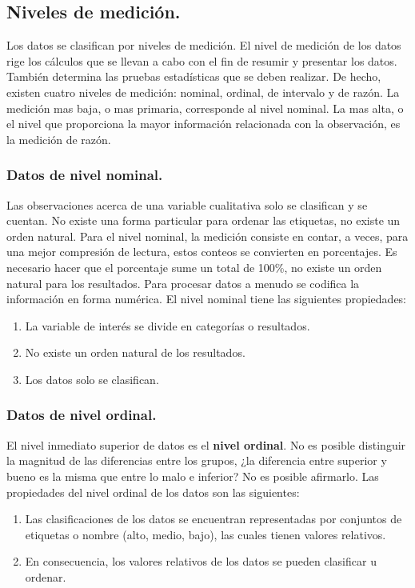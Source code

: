 \documentclass[]{article}
\begin{document}
\subsection{Niveles de medición.}
Los datos se clasifican por niveles de medición. El nivel de medición de los datos rige los cálculos que se llevan a cabo con el fin de resumir y presentar los datos. También determina las pruebas estadísticas que se deben realizar. De hecho, existen cuatro niveles de medición: nominal, ordinal, de intervalo y de razón. La medición mas baja, o mas primaria, corresponde al nivel nominal. La mas alta, o el nivel que proporciona la mayor información relacionada con la observación, es la medición de razón.

\subsubsection*{Datos de nivel nominal.}
Las observaciones acerca de una variable cualitativa solo se clasifican y se cuentan. No existe una forma particular para ordenar las etiquetas, no existe un orden natural. Para el nivel nominal, la medición consiste en contar, a veces, para una mejor compresión de lectura, estos conteos se convierten en porcentajes. Es necesario hacer que el porcentaje sume un total de 100\%, no existe un orden natural para los resultados. Para procesar datos a menudo se codifica la información en forma numérica. El nivel nominal tiene las siguientes propiedades:
\begin{enumerate}
	\item La variable de interés se divide en categorías o resultados.
	\item No existe un orden natural de los resultados.
	\item Los datos solo se clasifican.
\end{enumerate}

\subsubsection*{Datos de nivel ordinal.}
El nivel inmediato superior de datos es el \textbf{nivel ordinal}. No es posible distinguir la magnitud de las diferencias entre los grupos, ¿la diferencia entre superior y bueno es la misma que entre lo malo e inferior? No es posible afirmarlo. Las propiedades del nivel ordinal de los datos son las siguientes:
\begin{enumerate}
	\item Las clasificaciones de los datos se encuentran representadas por conjuntos de etiquetas o nombre (alto, medio, bajo), las cuales tienen valores relativos.
	\item En consecuencia, los valores relativos de los datos se pueden clasificar u ordenar.
\end{enumerate}
\end{document}
